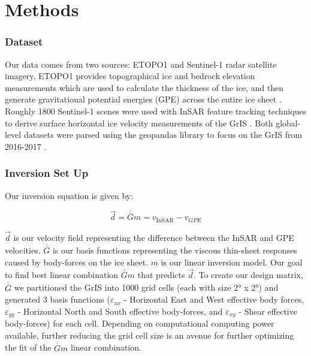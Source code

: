 \documentclass{article}
\begin{document}

\section{Methods}

\subsubsection{Dataset}
Our data comes from two sources: ETOPO1 and Sentinel-1 radar satellite imagery. ETOPO1 provides topographical ice and bedrock elevation measurements which are used to calculate the thickness of the ice, and then generate gravitational potential energies (GPE) across the entire ice sheet \cite{information_ncei_etopo1_nodate}. Roughly 1800 Sentinel-1 scenes were used with InSAR feature tracking techniques to derive surface horizontal ice velocity measurements of the GrIS \cite{nagler_sentinel-1_2015}. Both global-level datasets were parsed using the geopandas library to focus on the GrIS from 2016-2017 \cite{jordahl_geopandasgeopandas_2020}. 



\subsubsection{Inversion Set Up}

Our inversion equation is given by:

$$
\vec{d}=\overline{\overline{G}} m=v_{\text {InSAR}}-v_{GPE}
$$

$\vec{d}$ is our velocity field representing the difference between the InSAR and GPE velocities. $\overline{\overline{G}}$ is our basis functions representing the viscous thin-sheet responses caused by body-forces on the ice sheet. $m$ is our linear inversion model. Our goal to find best linear combination $\overline{\overline{G}} m$ that predicts $\vec{d}$. To create our design matrix, $\overline{\overline{G}}$ we partitioned the GrIS into 1000 grid cells (each with size 2° x 2°) and generated 3 basis functions ($\varepsilon_{xx}$ - Horizontal East and West effective body forces, $\varepsilon_{yy}$ - Horizontal North and South effective body-forces, and $\varepsilon_{xy}$ - Shear effective body-forces) for each cell. Depending on computational computing power available, further reducing the grid cell size is an avenue for further optimizing the fit of the  $\overline{\overline{G}} m$ linear combination.   
\end{document}
